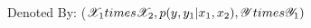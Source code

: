 \documentclass[preview]{standalone}
\begin{document}
\begin{center}
Denoted By: ($\mathscr{X}_1 \\times \mathscr{X}_2 ,p(y,y_1|x_1,x_2),\mathscr{Y} \\times \mathscr{Y}_1)$
\end{center}
\end{document}
